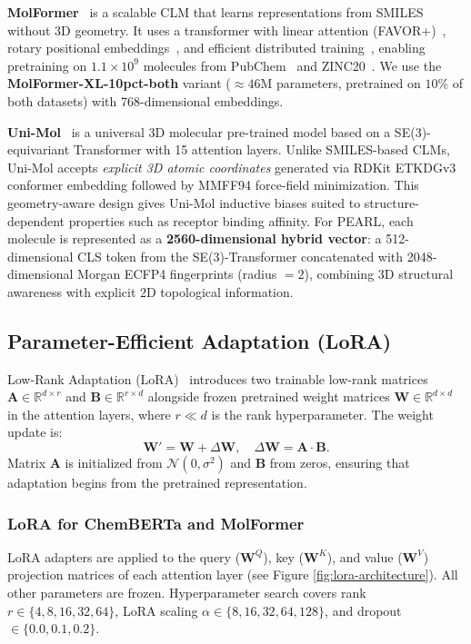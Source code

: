 \documentclass[pdflatex,sn-mathphys-num]{sn-jnl}%
\begin{document}
\textbf{MolFormer}~\cite{ross2022molformer} is a scalable CLM that learns representations from SMILES without 3D geometry. It uses a transformer with linear attention (FAVOR+)~\cite{choromanski2021rethinking}, rotary positional embeddings~\cite{heo2024rotary}, and efficient distributed training~\cite{isard2009distributed}, enabling pretraining on $1.1\times 10^{9}$ molecules from PubChem~\cite{kim2023pubchem} and ZINC20~\cite{irwin2020zinc20}. We use the \textbf{MolFormer-XL-10pct-both} variant ($\approx 46$M parameters, pretrained on $10\%$ of both datasets) with 768-dimensional embeddings.

\textbf{Uni-Mol}~\cite{zhou2023unimol} is a universal 3D molecular pre-trained model based on a SE(3)-equivariant Transformer with 15 attention layers. Unlike SMILES-based CLMs, Uni-Mol accepts \emph{explicit 3D atomic coordinates} generated via RDKit ETKDGv3 conformer embedding followed by MMFF94 force-field minimization. This geometry-aware design gives Uni-Mol inductive biases suited to structure-dependent properties such as receptor binding affinity. For PEARL, each molecule is represented as a \textbf{2560-dimensional hybrid vector}: a 512-dimensional CLS token from the SE(3)-Transformer concatenated with 2048-dimensional Morgan ECFP4 fingerprints (radius $= 2$), combining 3D structural awareness with explicit 2D topological information.

\subsection{Parameter-Efficient Adaptation (LoRA)}\label{sec:lora}
Low-Rank Adaptation (LoRA)~\cite{hu2021lora} introduces two trainable low-rank matrices $\mathbf{A} \in \mathbb{R}^{d \times r}$ and $\mathbf{B} \in \mathbb{R}^{r \times d}$ alongside frozen pretrained weight matrices $\mathbf{W} \in \mathbb{R}^{d \times d}$ in the attention layers, where $r \ll d$ is the rank hyperparameter. The weight update is:
\begin{equation}
  \mathbf{W}' = \mathbf{W} + \Delta\mathbf{W}, \quad \Delta\mathbf{W} = \mathbf{A} \cdot \mathbf{B}.
\end{equation}
Matrix $\mathbf{A}$ is initialized from $\mathcal{N}(0, \sigma^2)$ and $\mathbf{B}$ from zeros, ensuring that adaptation begins from the pretrained representation.

\subsubsection{LoRA for ChemBERTa and MolFormer}
LoRA adapters are applied to the query ($\mathbf{W}^Q$), key ($\mathbf{W}^K$), and value ($\mathbf{W}^V$) projection matrices of each attention layer (see Figure \ref{fig:lora-architecture}). All other parameters are frozen. Hyperparameter search covers rank $r \in \{4, 8, 16, 32, 64\}$, LoRA scaling $\alpha \in \{8, 16, 32, 64, 128\}$, and dropout $\in \{0.0, 0.1, 0.2\}$.
\end{document}
